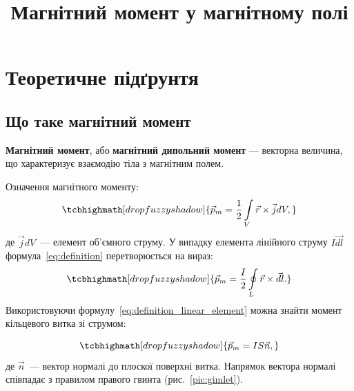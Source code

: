 \documentclass{LabWork}
\title{Магнітний момент у магнітному полі}
\begin{document}
\writedatatofile{\jobname}
\maketitle


\section{Теоретичне підґрунтя}
\subsection{Що таке магнітний момент}

\textbf{Магнітний момент}, або \textbf{магнітний дипольний момент} --- векторна величина, що характеризує взаємодію тіла з магнітним полем.

Означення магнітного моменту:
\begin{equation}\label{eq:definition}
	\tcbhighmath[drop fuzzy shadow]{
		\vec{p}_m = \frac12 \int\limits_V \vec{r} \times \vec{j} dV,
	}
\end{equation}
де $\vec{j} dV$~--- елемент об'ємного струму. У випадку елемента лінійного струму $I\vec{dl}$ формула~\eqref{eq:definition} перетворюється на вираз:
\begin{equation}\label{eq:definition_linear_element}
	\tcbhighmath[drop fuzzy shadow]{
		\vec{p}_m = \frac{I}{2} \oint\limits_L \vec{r} \times \vec{dl}.
	}
\end{equation}
Використовуючи формулу~\eqref{eq:definition_linear_element} можна знайти момент кільцевого витка зі струмом:

\begin{equation}\label{eq:circuit}
	\tcbhighmath[drop fuzzy shadow]{
		\vec{p}_m = IS\vec{n},
	}
\end{equation}
де $\vec{n}$~--- вектор нормалі до плоскої поверхні витка. Напрямок вектора нормалі співпадає з правилом правого гвинта (рис.~\ref{pic:gimlet}).
\end{document}
